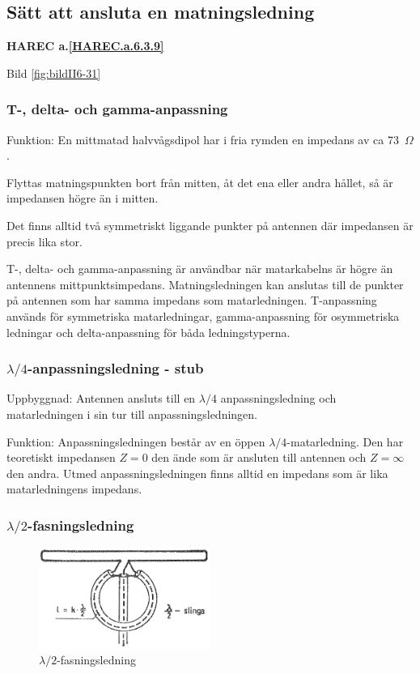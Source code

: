 \subsection{Sätt att ansluta en matningsledning}
\textbf{
HAREC a.\ref{HAREC.a.6.3.9}\label{myHAREC.a.6.3.9}
}

Bild \ref{fig:bildII6-31}

\subsubsection{T-, delta- och gamma-anpassning}

Funktion: En mittmatad halvvågsdipol har i fria rymden en impedans av ca 73~\(\Omega\).

Flyttas matningspunkten bort från mitten, åt det ena eller andra
hållet, så är impedansen högre än i mitten.

Det finns alltid två symmetriskt liggande punkter på antennen där
impedansen är precis lika stor.

T-, delta- och gamma-anpassning är användbar när matarkabelns är högre
än antennens mittpunktsimpedans. Matningsledningen kan anslutas till
de punkter på antennen som har samma impedans som
matarledningen. T-anpassning används för symmetriska matarledningar,
gamma-anpassning för osymmetriska ledningar och delta-anpassning för
båda ledningstyperna.

\subsubsection{\(\lambda/4\)-anpassningsledning - stub}

Uppbyggnad: Antennen ansluts till en \(\lambda/4\) anpassningsledning
och matarledningen i sin tur till anpassningsledningen.

Funktion: Anpassningsledningen består av en öppen
\(\lambda/4\)-matarledning. Den har teoretiskt impedansen \(Z = 0\)
den ände som är ansluten till antennen och \(Z = \infty\) den
andra. Utmed anpassningsledningen finns alltid en impedans som är lika
matarledningens impedans.

\subsubsection{$\lambda/2$-fasningsledning}

\begin{figure}
  \includegraphics[width=0.5\textwidth]{images/cropped_pdfs/bild_2_6-32.pdf}
  \caption{$\lambda/2$-fasningsledning}
  \label{fig:bildII6-32}
\end{figure}

